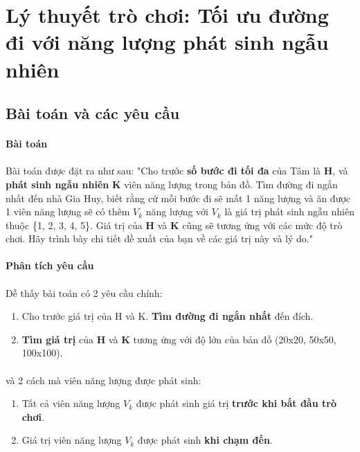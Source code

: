 \newpage
\section{Lý thuyết trò chơi: Tối ưu đường đi với năng lượng phát sinh ngẫu nhiên}

\subsection{Bài toán và các yêu cầu}

\paragraph{Bài toán}
\paragraph{}{Bài toán được đặt ra như sau: "Cho trước \textbf{số bước đi tối đa} của Tâm là \textbf{H}, và \textbf{phát sinh ngẫu nhiên} \textbf{K} viên năng lượng trong bản đồ. Tìm đường đi ngắn nhất đến nhà Gia Huy, biết rằng cứ mỗi bước đi sẽ mất 1 năng lượng và ăn được 1 viên năng lượng sẽ có thêm $V_k$ năng lượng với $V_k$ là giá trị phát sinh ngẫu nhiên thuộc \{1, 2, 3, 4, 5\}. Giá trị của \textbf{H} và \textbf{K} cũng sẽ tương ứng với các mức độ trò chơi. Hãy trình bày chi tiết đề xuất của bạn về các giá trị này và lý do."}

\paragraph{Phân tích yêu cầu}
\paragraph{}{Dễ thấy bài toán có 2 yêu cầu chính:}
\begin{enumerate}
    \item Cho trước giá trị của H và K. \textbf{Tìm đường đi ngắn nhất} đến đích.
    \item \textbf{Tìm giá trị} của \textbf{H} và \textbf{K} tương ứng với độ lớn của bản đồ (20x20, 50x50, 100x100).
\end{enumerate}
\paragraph{}{và 2 cách mà viên năng lượng được phát sinh:}
\begin{enumerate}
    \item Tất cả viên năng lượng $V_k$ được phát sinh giá trị \textbf{trước khi bắt đầu trò chơi}.
    \item Giá trị viên năng lượng $V_k$ được phát sinh \textbf{khi chạm đến}.
\end{enumerate}

